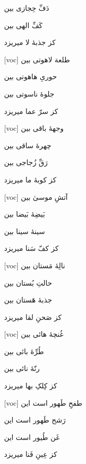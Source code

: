 \documentclass[11pt]{article}
\newenvironment{orig}
  {\begin{farsi}[voc]}
  {\end{farsi}}
\newenvironment{word}{}{}
\newcommand{\ayat}[1]{\vspace{4ex}\begin{orig}#1\end{orig}}
\begin{document}
\begin{word}
{دَفِّ حِجازی بین

کَفِّ الهی بین

کز جذبۀ لا میریزد
}

\ayat{
طلعة لاهوتی بین

حوریِ هاهوتی بین

جلوۀ ناسوتی بین

کز سرّ عما میریزد
}

\ayat{
وجهۀ باقی بین

چهرۀ ساقی بین

رَقِّ زُجاجی بین

کز کوبۀ ما میریزد
}

\ayat{
آتشِ موسیٰ بین

بَیضِۀ بَیضا بین

سینۀ سینا بین

کز کفّ سَنا میریزد
}

\ayat{
نالِۀ مَستان بین

حالتِ بُستان بین

جذبۀ هَستان بین

کز صَحنِ لقا میریزد
}

\ayat{
غُنچۀ هائی بین

طُرِّۀ بائی بین

رنّۀ نائی بین

کز کِلکِ بها میریزد
}

\ayat{
طفحِ طَهور است این

رَشح طَهور است این

غَن طُیور است این

کز عِینِ فَنا میریزد
}
\end{word}
\end{document}
